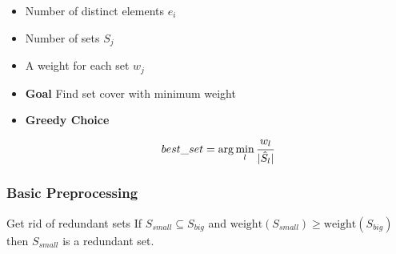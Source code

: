 \documentclass[xcolor=dvipsnames]{beamer}
\newlength\myheight
\newlength\mydepth
\newcommand*\inlinegraphics[1]{%
  \settototalheight\myheight{Xygp}%
  \settodepth\mydepth{Xygp}%
  \raisebox{-\mydepth}{\texttt{[image: \#1]}}%
}
\begin{document}
\begin{frame}
\begin{minipage}{0.45\textwidth}
\begin{overlayarea}{\textwidth}{0.5\textheight}
%
\end{overlayarea}%
\end{minipage}%
\begin{minipage}{0.55\textwidth} 
\begin{itemize}
\item<1-> Number of distinct elements $e_i$
\item<2-> Number of sets $S_j$
\item<3-> A weight for each set $w_j$
\item<4-> \textbf{Goal} Find set cover with minimum weight
\item<5> \textbf{Greedy Choice} $$best\_set = \arg \min_{l} \cfrac{w_l}{|\hat{S}_l|}$$
\end{itemize}
\end{minipage}
\end{frame}

\begin{frame}
\frametitle{Basic Preprocessing}
\begin{block}{Get rid of redundant sets \inlinegraphics{sweep.eps}}
If $S_{small} \subseteq S_{big}$ and $\text{weight}(S_{small})\geq \text{weight}(S_{big})$ then $S_{small}$ is a redundant set.
\end{block}
\end{frame}
\end{document}

